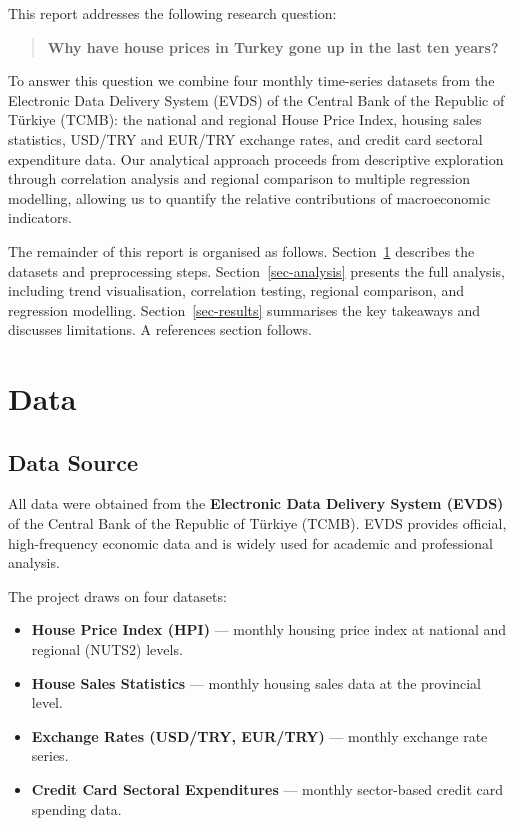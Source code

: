 \documentclass[
  11pt,
  a4paper,
]{article}
\providecommand{\tightlist}{%
  \setlength{\itemsep}{0pt}\setlength{\parskip}{0pt}}
\begin{document}
This report addresses the following research question:

\begin{quote}
\textbf{Why have house prices in Turkey gone up in the last ten years?}
\end{quote}

To answer this question we combine four monthly time-series datasets
from the Electronic Data Delivery System (EVDS) of the Central Bank of
the Republic of Türkiye (TCMB): the national and regional House Price
Index, housing sales statistics, USD/TRY and EUR/TRY exchange rates, and
credit card sectoral expenditure data. Our analytical approach proceeds
from descriptive exploration through correlation analysis and regional
comparison to multiple regression modelling, allowing us to quantify the
relative contributions of macroeconomic indicators.

The remainder of this report is organised as follows.
Section~\ref{sec-data} describes the datasets and preprocessing steps.
Section~\ref{sec-analysis} presents the full analysis, including trend
visualisation, correlation testing, regional comparison, and regression
modelling. Section~\ref{sec-results} summarises the key takeaways and
discusses limitations. A references section follows.

\section{Data}\label{sec-data}

\subsection{Data Source}\label{data-source}

All data were obtained from the \textbf{Electronic Data Delivery System
(EVDS)} of the Central Bank of the Republic of Türkiye (TCMB). EVDS
provides official, high-frequency economic data and is widely used for
academic and professional analysis.

The project draws on four datasets:

\begin{itemize}
\tightlist
\item
  \textbf{House Price Index (HPI)} --- monthly housing price index at
  national and regional (NUTS2) levels.
\item
  \textbf{House Sales Statistics} --- monthly housing sales data at the
  provincial level.
\item
  \textbf{Exchange Rates (USD/TRY, EUR/TRY)} --- monthly exchange rate
  series.
\item
  \textbf{Credit Card Sectoral Expenditures} --- monthly sector-based
  credit card spending data.
\end{itemize}
\end{document}
